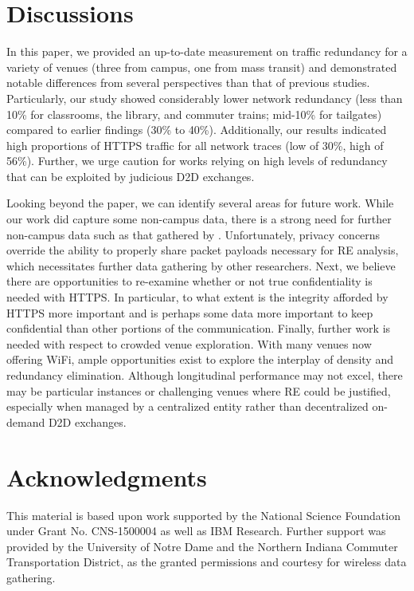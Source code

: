 \documentclass{sig-alternate}
\begin{document}
\section{Discussions}

In this paper, we provided an up-to-date measurement on traffic redundancy for a variety of venues (three from campus, one from mass transit) and demonstrated notable differences from several perspectives than that of previous studies. Particularly, our study showed considerably lower network redundancy (less than 10\% for classrooms, the library, and commuter trains; mid-10\% for tailgates) compared to earlier findings (30\% to 40\%). Additionally, our results indicated high proportions of HTTPS traffic for all network traces (low of 30\%, high of 56\%). Further, we urge caution for works relying on high levels of redundancy that can be exploited by judicious D2D exchanges.  

Looking beyond the paper, we can identify several areas for future work. While our work did capture some non-campus data, there is a strong need for further non-campus data such as that gathered by \cite{Finamore:2013}. Unfortunately, privacy concerns override the ability to properly share packet payloads necessary for RE analysis, which necessitates further data gathering by other researchers. Next, we believe there are opportunities to re-examine whether or not true confidentiality is needed with HTTPS. In particular, to what extent is the integrity afforded by HTTPS more important and is perhaps some data more important to keep confidential than other portions of the communication.  Finally, further work is needed with respect to crowded venue exploration.  With many venues now offering WiFi, ample opportunities exist to explore the interplay of density and redundancy elimination. Although longitudinal performance may not excel, there may be particular instances or challenging venues where RE could be justified, especially when managed by a centralized entity rather than decentralized on-demand D2D exchanges.

\section*{Acknowledgments}
\noindent This material is based upon work supported by the National Science Foundation under Grant No. CNS-1500004 as well as IBM Research. Further support was provided by the University of Notre Dame and the Northern Indiana Commuter Transportation District, as the granted permissions and courtesy for wireless data gathering.

\clearpage


  
\end{document}
